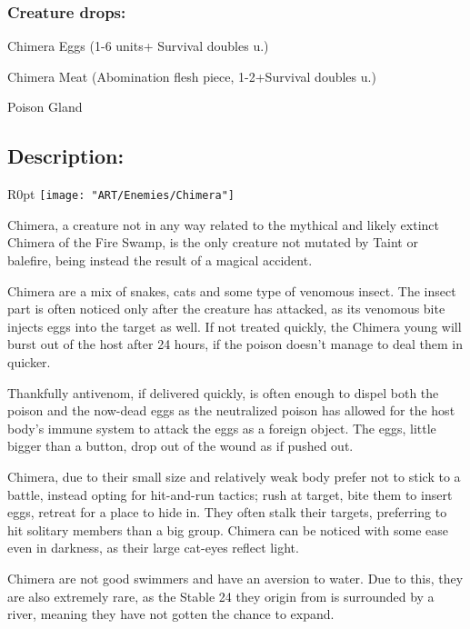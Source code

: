 \documentclass[11pt,a4paper,twocolumn]{book}
\begin{document}
	\subsubsection*{Creature drops:}
	\begin{compactitem}
		\item Chimera Eggs (1-6 units+ Survival doubles u.)
		\item Chimera Meat (Abomination flesh piece, 1-2+Survival doubles u.)
		\item Poison Gland
	\end{compactitem}	
	
	\subsection*{Description:}
	
	\begin{wrapfigure}{R}{0pt}
		\texttt{[image: "ART/Enemies/Chimera"]}
	\end{wrapfigure}
	
	Chimera, a creature not in any way related to the mythical and likely extinct Chimera of the Fire Swamp, is the only creature not mutated by Taint or balefire, being instead the result of a magical accident.
	
	Chimera are a mix of snakes, cats and some type of venomous insect. The insect part is often noticed only after the creature has attacked, as its venomous bite injects eggs into the target as well. If not treated quickly, the Chimera young will burst out of the host after 24 hours, if the poison doesn't manage to deal them in quicker. 
	
	Thankfully antivenom, if delivered quickly, is often enough to dispel both the poison and the now-dead eggs as the neutralized poison has allowed for the host body's immune system to attack the eggs as a foreign object. The eggs, little bigger than a button, drop out of the wound as if pushed out.
	
	\bigskip
	Chimera, due to their small size and relatively weak body prefer not to stick to a battle, instead opting for hit-and-run tactics; rush at target, bite them to insert eggs, retreat for a place to hide in. They often stalk their targets, preferring to hit solitary members than a big group.
	Chimera can be noticed with some ease even in darkness, as their large cat-eyes reflect light. 
	
	Chimera are not good swimmers and have an aversion to water. Due to this, they are also extremely rare, as the Stable 24 they origin from is surrounded by a river, meaning they have not gotten the chance to expand.
	
\end{document}
